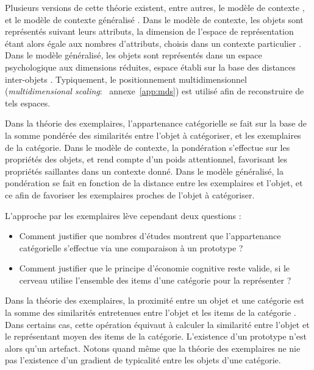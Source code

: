 {Plusieurs versions de cette théorie existent, entre autres, le modèle de contexte \citep{medin1978context}, et le modèle de contexte généralisé \citep{nosofsky1986attention}. Dans le modèle de contexte, les objets sont représentés suivant leurs attributs, la dimension de l'espace de représentation étant alors égale aux nombres d'attributs, choisis dans un contexte particulier \citep{hitzman1986schema}. Dans le modèle généralisé, les objets sont représentés dans un espace psychologique aux dimensions réduites, espace établi sur la base des distances inter-objets \citep{nosofsky1992similarity}. Typiquement, le positionnement multidimensionnel (\emph{multidimensional scaling}: \cf~annexe~\ref{app:mds}) est utilisé afin de reconstruire de tels espaces.

Dans la théorie des exemplaires, l'appartenance catégorielle se fait sur la base de la somme pondérée des similarités entre l'objet à catégoriser, et les exemplaires de la catégorie. Dans le modèle de contexte, la pondération s'effectue sur les propriétés des objets, et rend compte d'un poids attentionnel, favorisant les propriétés saillantes dans un contexte donné. Dans le modèle généralisé, la pondération se fait en fonction de la distance entre les exemplaires et l’objet, et ce afin de favoriser les exemplaires proches de l'objet à catégoriser.

L'approche par les exemplaires lève cependant deux questions \citep{goldstone2003concepts}:

\begin{itemize}
\item Comment justifier que nombres d'études montrent que l'appartenance catégorielle s'effectue via une comparaison à un prototype ?
\item Comment justifier que le principe d'économie cognitive reste valide, si le cerveau utilise l'ensemble des items d'une catégorie pour la représenter ? 
\end{itemize}

Dans la théorie des exemplaires, la proximité entre un objet et une catégorie est la somme des similarités entretenues entre l'objet et les items de la catégorie \citep{nosofsky1986attention}. Dans certains cas, cette opération équivaut à calculer la similarité entre l'objet et le représentant moyen des items de la catégorie. L’existence d'un prototype n'est alors qu'un artefact. Notons quand même que la théorie des exemplaires ne nie pas l'existence d'un gradient de typicalité entre les objets d'une catégorie.

}
